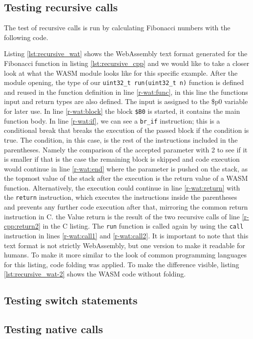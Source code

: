 \subsection{Testing recursive calls}
The test of recursive calls is run by calculating Fibonacci numbers with the following code.


Listing \ref{lst:recursive_wat} shows the WebAssembly text format generated for the Fibonacci function in listing \ref{lst:recursive_cpp} and we would like to take a closer look at what the WASM module looks like for this specific example. After the module opening, the type of our \lstinline{uint32_t run(uint32_t n)} function is defined and reused in the function definition in line \ref{r-wat:func}, in this line the functions input and return types are also defined. The input is assigned to the \$p0 variable for later use. In line \ref{r-wat:block} the block \lstinline{$B0} is started, it contains the main function body. In line \ref{r-wat:if}, we can see a \lstinline{br_if} instruction; this is a conditional break that breaks the execution of the passed block if the condition is true. The condition, in this case, is the rest of the instructions included in the parentheses. Namely the comparison of the accepted parameter with 2 to see if it is smaller if that is the case the remaining block is skipped and code execution would continue in line \ref{r-wat:end} where the parameter is pushed on the stack, as the topmost value of the stack after the execution is the return value of a WASM function. Alternatively, the execution could continue in line \ref{r-wat:return} with the \lstinline{return} instruction, which executes the instructions inside the parentheses and prevents any further code execution after that, mirroring the common return instruction in C. the Value return is the result of the two recursive calls of line \ref{r-cpp:return2} in the C listing. The \lstinline{run} function is called again by using the \lstinline{call} instruction in lines \ref{r-wat:call1} and \ref{r-wat:call2}.   
It is important to note that this text format is not strictly WebAssembly, but one version to make it readable for humans. To make it more similar to the look of common programming languages for this listing, code folding was applied. To make the difference visible, listing \ref{lst:recursive_wat-2} shows the WASM code without folding.

\subsection{Testing switch statements}
\subsection{Testing native calls}\label{subsec:native}